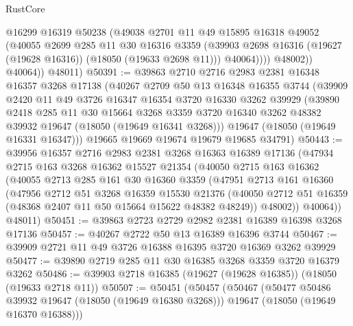 \begin{lexlean}{RustCore}
\begin{coremodule}
                  @16299
                  @16319
                  @50238
                  (@49038
                    @2701
                    @11
                    @49
                    @15895
                    @16318
                    @49052
                    (@40055
                      @2699
                      @285
                      @11
                      @30
                      @16316
                      @3359
                      (@39903 @2698 @16316 (@19627 (@19628 @16316)) (@18050 (@19633 @2698 @11)))
                      @40064))))
              @48002))
          @40064))
      @48011)
@50391 := @39863
    @2710
    @2716
    @2983
    @2381
    @16348
    @16357
    @3268
    @17138
    (@40267
      @2709
      @50
      @13
      @16348
      @16355
      @3744
      (@39909
        @2420
        @11
        @49
        @3726
        @16347
        @16354
        @3720
        @16330
        @3262
        @39929
        (@39890
          @2418
          @285
          @11
          @30
          @15664
          @3268
          @3359
          @3720
          @16340
          @3262
          @48382
          @39932
          @19647
          (@18050 (@19649 @16341 @3268)))
        @19647
        (@18050 (@19649 @16331 @16347)))
      @19665
      @19669
      @19674
      @19679
      @19685
      @34791)
@50443 := @39956
    @16357
    @2716
    @2983
    @2381
    @3268
    @16363
    @16389
    @17136
    (@47934
      @2715
      @163
      @3268
      @16362
      @15527
      @21354
      (@40050
        @2715
        @163
        @16362
        (@40055
          @2713
          @285
          @161
          @30
          @16360
          @3359
          (@47951
            @2713
            @161
            @16360
            (@47956
              @2712
              @51
              @3268
              @16359
              @15530
              @21376
              (@40050 @2712 @51 @16359 (@48368 @2407 @11 @50 @15664 @15622 @48382 @48249))
              @48002))
          @40064))
      @48011)
@50451 := @39863 @2723 @2729 @2982 @2381 @16389 @16398 @3268 @17136
@50457 := @40267 @2722 @50 @13 @16389 @16396 @3744
@50467 := @39909 @2721 @11 @49 @3726 @16388 @16395 @3720 @16369 @3262 @39929
@50477 := @39890 @2719 @285 @11 @30 @16385 @3268 @3359 @3720 @16379 @3262
@50486 := @39903 @2718 @16385 (@19627 (@19628 @16385)) (@18050 (@19633 @2718 @11))
@50507 := @50451
    (@50457
      (@50467
        (@50477 @50486 @39932 @19647 (@18050 (@19649 @16380 @3268)))
        @19647
        (@18050 (@19649 @16370 @16388)))

\end{coremodule}
\end{lexlean}
